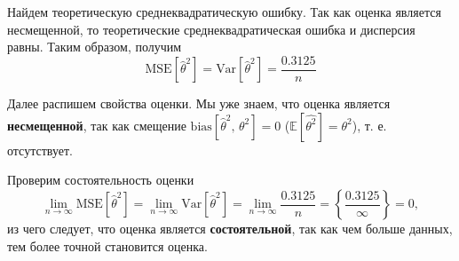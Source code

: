 \documentclass[a4paper, 12pt]{article}
\begin{document}
    
    Найдем теоретическую среднеквадратическую ошибку. Так как оценка является несмещенной, то теоретические среднеквадратическая ошибка и дисперсия равны. Таким образом, получим
    $$\text{MSE}{\left[\hat{\theta}^2\right]}=\text{Var}{\left[\hat{\theta}^2\right]}=\dfrac{0.3125}{n}$$


    Далее распишем свойства оценки. Мы уже знаем, что оценка является \textbf{несмещенной}, так как смещение $\text{bias}{\left[\hat{\theta}^2,\,\theta^2\right]}=0$ ($\mathbb{E}\left[\hat{\theta^2}\right]=\theta^2$), т. е. отсутствует.


    Проверим состоятельность оценки
    $$\lim\limits_{n\rightarrow\infty}\text{MSE}{\left[\hat{\theta}^2\right]}=\lim\limits_{n\rightarrow\infty}\text{Var}{\left[\hat{\theta}^2\right]}=\lim\limits_{n\rightarrow\infty}\dfrac{0.3125}{n}=\left\{\dfrac{0.3125}{\infty}\right\}=0,$$
    из чего следует, что оценка является \textbf{состоятельной}, так как чем больше данных, тем более точной становится оценка.
\end{document}
